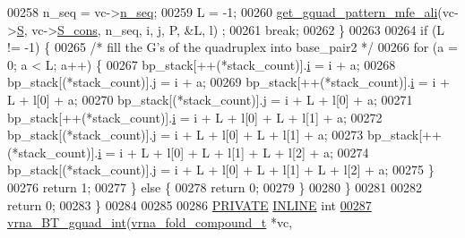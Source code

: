 \begin{DoxyCode}
00258         n\_seq = vc->\mbox{\hyperlink{group__fold__compound_a614702ab74478e786272be44f8cebfe3}{n\_seq}};
00259         L     = -1;
00260         \mbox{\hyperlink{group__gquads_gae3904ba679df6cb7284cb3153410dac2}{get\_gquad\_pattern\_mfe\_ali}}(vc->\mbox{\hyperlink{group__fold__compound_aebb37297f92c7bd22aac6343f8f61d61}{S}}, vc->\mbox{\hyperlink{group__fold__compound_aa3fab7ae38ebfed2028375221d295686}{S\_cons}}, n\_seq, i, j, P, &L, l)
      ;
00261         \textcolor{keywordflow}{break};
00262     \}
00263 
00264     \textcolor{keywordflow}{if} (L != -1) \{
00265       \textcolor{comment}{/* fill the G's of the quadruplex into base\_pair2 */}
00266       \textcolor{keywordflow}{for} (a = 0; a < L; a++) \{
00267         bp\_stack[++(*stack\_count)].\mbox{\hyperlink{group__data__structures_a34d7d05bb7cc48d60823a8cc50a3959f}{i}}  = i + a;
00268         bp\_stack[(*stack\_count)].\mbox{\hyperlink{group__data__structures_a95abd1d1b08d6d242c77bc069782e8c9}{j}}    = i + a;
00269         bp\_stack[++(*stack\_count)].\mbox{\hyperlink{group__data__structures_a34d7d05bb7cc48d60823a8cc50a3959f}{i}}  = i + L + l[0] + a;
00270         bp\_stack[(*stack\_count)].\mbox{\hyperlink{group__data__structures_a95abd1d1b08d6d242c77bc069782e8c9}{j}}    = i + L + l[0] + a;
00271         bp\_stack[++(*stack\_count)].\mbox{\hyperlink{group__data__structures_a34d7d05bb7cc48d60823a8cc50a3959f}{i}}  = i + L + l[0] + L + l[1] + a;
00272         bp\_stack[(*stack\_count)].\mbox{\hyperlink{group__data__structures_a95abd1d1b08d6d242c77bc069782e8c9}{j}}    = i + L + l[0] + L + l[1] + a;
00273         bp\_stack[++(*stack\_count)].\mbox{\hyperlink{group__data__structures_a34d7d05bb7cc48d60823a8cc50a3959f}{i}}  = i + L + l[0] + L + l[1] + L + l[2] + a;
00274         bp\_stack[(*stack\_count)].\mbox{\hyperlink{group__data__structures_a95abd1d1b08d6d242c77bc069782e8c9}{j}}    = i + L + l[0] + L + l[1] + L + l[2] + a;
00275       \}
00276       \textcolor{keywordflow}{return} 1;
00277     \} \textcolor{keywordflow}{else} \{
00278       \textcolor{keywordflow}{return} 0;
00279     \}
00280   \}
00281 
00282   \textcolor{keywordflow}{return} 0;
00283 \}
00284 
00285 
00286 \mbox{\hyperlink{edit__cost_8h_a5e151c615eda34903514212f05a5ccf8}{PRIVATE}} \mbox{\hyperlink{gquad_8h_a2eb6f9e0395b47b8d5e3eeae4fe0c116}{INLINE}} \textcolor{keywordtype}{int}
\mbox{\hyperlink{group__gquads_ga186573840ad56e95029b9ab772e4c040}{00287}} \mbox{\hyperlink{group__gquads_ga186573840ad56e95029b9ab772e4c040}{vrna\_BT\_gquad\_int}}(\mbox{\hyperlink{group__fold__compound_structvrna__fc__s}{vrna\_fold\_compound\_t}}  *vc,

\end{DoxyCode}
